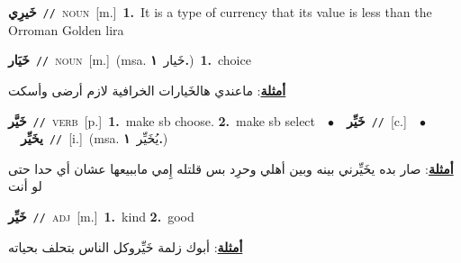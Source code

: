 \documentclass[10pt,a4paper,twoside]{article} %
\begin{document}
\begin{multicols}{2}
{\setlength\topsep{0pt}\textbf{\foreignlanguage{arabic}{خَيرِي}}\ {\color{gray}\texttt{//}\color{black}}\ \textsc{noun}\ [m.]\ \textbf{1.}~It is a type of currency that its value is less than the Orroman Golden lira\ } \vspace{2mm}

{\setlength\topsep{0pt}\textbf{\foreignlanguage{arabic}{خَيَار}}\ {\color{gray}\texttt{//}\color{black}}\ \textsc{noun}\ [m.]\ \color{gray}(msa. \foreignlanguage{arabic}{خَيار}~\foreignlanguage{arabic}{\textbf{١.}})\color{black}\ \textbf{1.}~choice\  \begin{flushright}\color{gray}\foreignlanguage{arabic}{\textbf{\underline{\foreignlanguage{arabic}{أمثلة}}}: ماعندي هالخَيارات الخرافية لازم أرضى وأسكت}\end{flushright}\color{black}} \vspace{2mm}

{\setlength\topsep{0pt}\textbf{\foreignlanguage{arabic}{خَيَّر}}\ {\color{gray}\texttt{//}\color{black}}\ \textsc{verb}\ [p.]\ \textbf{1.}~make sb choose.  \textbf{2.}~make sb select\ \ $\bullet$\ \ \setlength\topsep{0pt}\textbf{\foreignlanguage{arabic}{خَيِّر}}\ {\color{gray}\texttt{//}\color{black}}\ [c.]\ \ $\bullet$\ \ \setlength\topsep{0pt}\textbf{\foreignlanguage{arabic}{يخَيِّر}}\ {\color{gray}\texttt{//}\color{black}}\ [i.]\ \color{gray}(msa. \foreignlanguage{arabic}{يُخَيِّر}~\foreignlanguage{arabic}{\textbf{١.}})\color{black}\  \begin{flushright}\color{gray}\foreignlanguage{arabic}{\textbf{\underline{\foreignlanguage{arabic}{أمثلة}}}: صار بده يخَيِّرني بينه وبين أهلي وحرِد بس قلتله إِمي ماببيعها عشان أي حدا حتى لو أنت}\end{flushright}\color{black}} \vspace{2mm}

{\setlength\topsep{0pt}\textbf{\foreignlanguage{arabic}{خَيِّر}}\ {\color{gray}\texttt{//}\color{black}}\ \textsc{adj}\ [m.]\ \textbf{1.}~kind  \textbf{2.}~good\  \begin{flushright}\color{gray}\foreignlanguage{arabic}{\textbf{\underline{\foreignlanguage{arabic}{أمثلة}}}: أبوك زلمة خَيِّروكل الناس بتحلف بحياته}\end{flushright}\color{black}} \vspace{2mm}


\end{multicols}
\end{document}

